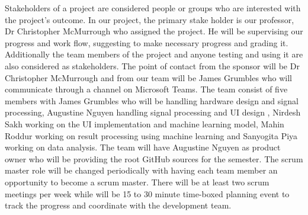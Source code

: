 Stakeholders of a project are considered people or groups who are interested with the project's outcome. In our project, the primary stake holder is our professor, Dr Christopher McMurrough who assigned the project. He will be supervising our progress and work flow, suggesting to make necessary progress and grading it. Additionally the team members of the project and anyone testing and using it are also considered as stakeholders. The point of contact from the sponsor will be Dr Christopher McMurrough and from our team will be James Grumbles who will communicate through a channel on Microsoft Teams. The team consist of five members with James Grumbles who will be handling hardware design and signal processing, Augustine Nguyen handling signal processing and UI design , Nirdesh Sakh working on the UI implementation and machine learning model, Mahin Roddur working on result processing using machine learning and Sanyogita Piya working on data analysis. The team will have Augustine Nguyen as product owner who will be providing the root GitHub sources for the semester. The scrum master role will be changed periodically with having each team member an opportunity to become a scrum master. There will be at least two scrum meetings per week while will be 15 to 30 minute time-boxed planning event to track the progress and coordinate with the development team.  
